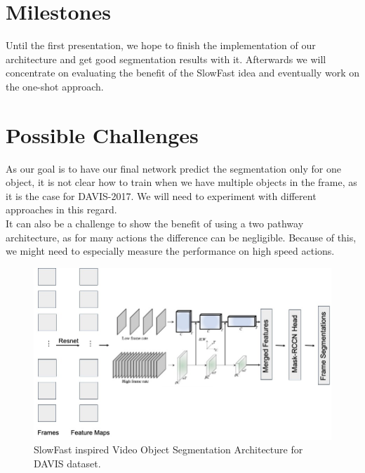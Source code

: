 \documentclass[conference]{IEEEtran}
\begin{document}
\section{Milestones}
Until the first presentation, we hope to finish the implementation of our architecture and get good segmentation results with it. Afterwards we will concentrate on evaluating the benefit of the SlowFast idea and eventually work on the one-shot approach.

\section{Possible Challenges}
As our goal is to have our final network predict the segmentation only for one object, it is not clear how to train when we have multiple objects in the frame, as it is the case for DAVIS-2017. We will need to experiment with different approaches in this regard.\\
It can also be a challenge to show the benefit of using a two pathway architecture, as for many actions the difference can be negligible. Because of this, we might need to especially measure the performance on high speed actions.


\begin{figure}
	\centering
	\includegraphics[width=1.8\columnwidth]{OurArchitecture.jpg}
	\caption{SlowFast inspired Video Object Segmentation Architecture for DAVIS dataset.}
	\label{fig:slowfastadapted}
\end{figure}
\newpage



\end{document}
